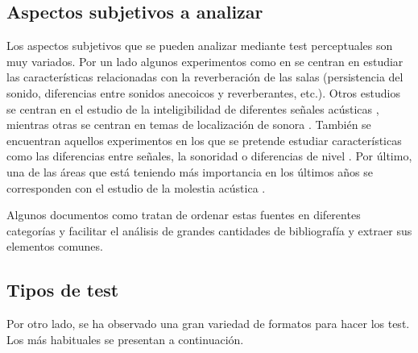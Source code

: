\documentclass[11pt,a4paper]{book}
\begin{document}
        \subsection{Aspectos subjetivos a analizar}
		    Los aspectos subjetivos que se pueden analizar mediante test perceptuales son muy variados. Por un lado algunos experimentos como en \cite{1995GASoulodre, 2016SKlockgether,  2016BPostma, 2002PZahorik} se centran en estudiar las características relacionadas con la reverberación de las salas (persistencia del sonido, diferencias entre sonidos anecoicos y reverberantes, etc.). Otros estudios se centran en el estudio de la inteligibilidad de diferentes señales acústicas \cite{ 1999JBradley, 2010FMartellotta,  2010MVigeant}, mientras otras se centran en temas de localización de sonora \cite{1997SCarlile, 2019MShiell, 2019MYamada, 2019DMorikawa}. También se encuentran aquellos experimentos en los que se pretende estudiar características como las diferencias entre señales, la sonoridad o diferencias de nivel \cite{2019GPulvirenti, 2016SKlockgether, 2019MNowak, 2011VEmiya, 2019LKritly, 2005IWitew,  2019DJSchlit}. Por último, una de las áreas que está teniendo más importancia en los últimos años se corresponden con el estudio de la molestia acústica \cite{2019VHongisto, 2019JLee, 2019VRajala}.
		    
            Algunos documentos como \cite{Tejada2020} tratan de ordenar estas fuentes en diferentes categorías y facilitar el análisis de grandes cantidades de bibliografía y extraer sus elementos comunes.
            
        \subsection{Tipos de test}
    		Por otro lado, se ha observado una gran variedad de formatos para hacer los test. Los más habituales se presentan a continuación.
    
\end{document}
